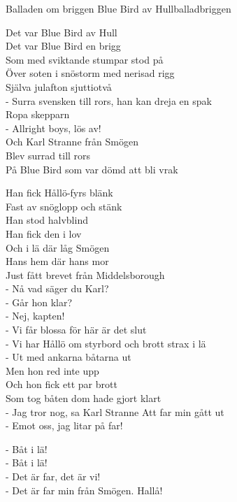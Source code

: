 \begin{song}{Balladen om briggen Blue Bird av Hull}{balladbriggen}
\begin{vers}
Det var Blue Bird av Hull\\
Det var Blue Bird en brigg\\
Som med sviktande stumpar stod på\\
Över soten i snöstorm med nerisad rigg\\
Själva julafton sjuttiotvå\\
- Surra svensken till rors, han kan dreja en spak\\
Ropa skepparn\\
- Allright boys, lös av!\\
Och Karl Stranne från Smögen\\
Blev surrad till rors\\
På Blue Bird som var dömd att bli vrak\\
\end{vers}
\begin{vers}
Han fick Hållö-fyrs blänk\\
Fast av snöglopp och stänk\\
Han stod halvblind\\
Han fick den i lov\\
Och i lä där låg Smögen\\
Hans hem där hans mor\\
Just fått brevet från Middelsborough\\
- Nå vad säger du Karl?\\
- Går hon klar?\\
- Nej, kapten!\\
- Vi får blossa för här är det slut\\
- Vi har Hållö om styrbord och brott strax i lä\\
- Ut med ankarna båtarna ut\\
Men hon red inte upp\\
Och hon fick ett par brott\\
Som tog båten dom hade gjort klart\\
- Jag tror nog, sa Karl Stranne Att far min gått ut\\
- Emot oss, jag litar på far!\\
\end{vers}
\begin{vers}
- Båt i lä!\\
- Båt i lä!\\
- Det är far, det är vi!\\
- Det är far min från Smögen. Hallå!\\

\end{vers}
\end{song}
